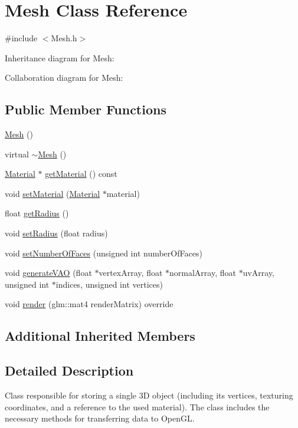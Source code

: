 \hypertarget{classMesh}{}\section{Mesh Class Reference}
\label{classMesh}


{\ttfamily \#include $<$Mesh.\+h$>$}



Inheritance diagram for Mesh\+:


Collaboration diagram for Mesh\+:
\subsection*{Public Member Functions}
\begin{DoxyCompactItemize}
\item 
\hyperlink{classMesh_a2af137f1571af89172b9c102302c416b}{Mesh} ()
\item 
virtual \hyperlink{classMesh_a5efe4da1a4c0971cfb037bd70304c303}{$\sim$\+Mesh} ()
\item 
\hyperlink{classMaterial}{Material} $\ast$ \hyperlink{classMesh_ad0815fc310ab9de09381978871f2bc77}{get\+Material} () const
\item 
void \hyperlink{classMesh_acee71afee77988e9233bee788ac501f3}{set\+Material} (\hyperlink{classMaterial}{Material} $\ast$material)
\item 
float \hyperlink{classMesh_adad2377f4e9ba111309593ead1242a57}{get\+Radius} ()
\item 
void \hyperlink{classMesh_a02add67a4d615f48594c2e70d15da2c8}{set\+Radius} (float radius)
\item 
void \hyperlink{classMesh_ad53ff995738c244717611c437db95462}{set\+Number\+Of\+Faces} (unsigned int number\+Of\+Faces)
\item 
void \hyperlink{classMesh_a024b57bf1f509baa3d6aef3c530c74ee}{generate\+V\+AO} (float $\ast$vertex\+Array, float $\ast$normal\+Array, float $\ast$uv\+Array, unsigned int $\ast$indices, unsigned int vertices)
\item 
void \hyperlink{classMesh_a4d69d0cadc7f4c10d7b30b19ee1220cc}{render} (glm\+::mat4 render\+Matrix) override
\end{DoxyCompactItemize}
\subsection*{Additional Inherited Members}


\subsection{Detailed Description}
Class responsible for storing a single 3D object (including its vertices, texturing coordinates, and a reference to the used material). The class includes the necessary methods for transferring data to Open\+GL. 

